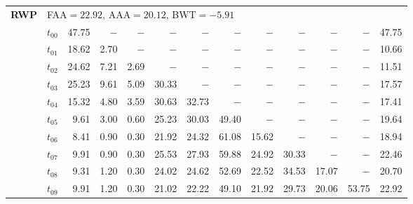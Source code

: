 \begin{table}[ht]
\begin{tabular}{@{}l l r r r r r r r r r r r@{}}
\midrule
\multirow{11}{*}{\textbf{RWP}} & \multicolumn{12}{l}{\quad\small FAA$=22.92$,\; AAA$=20.12$,\; BWT$=-5.91$} \\
 & $t_{00}$ & 47.75 & $-$ & $-$ & $-$ & $-$ & $-$ & $-$ & $-$ & $-$ & $-$ & 47.75 \\
 & $t_{01}$ & 18.62 & 2.70 & $-$ & $-$ & $-$ & $-$ & $-$ & $-$ & $-$ & $-$ & 10.66 \\
 & $t_{02}$ & 24.62 & 7.21 & 2.69 & $-$ & $-$ & $-$ & $-$ & $-$ & $-$ & $-$ & 11.51 \\
 & $t_{03}$ & 25.23 & 9.61 & 5.09 & 30.33 & $-$ & $-$ & $-$ & $-$ & $-$ & $-$ & 17.57 \\
 & $t_{04}$ & 15.32 & 4.80 & 3.59 & 30.63 & 32.73 & $-$ & $-$ & $-$ & $-$ & $-$ & 17.41 \\
 & $t_{05}$ & 9.61 & 3.00 & 0.60 & 25.23 & 30.03 & 49.40 & $-$ & $-$ & $-$ & $-$ & 19.64 \\
 & $t_{06}$ & 8.41 & 0.90 & 0.30 & 21.92 & 24.32 & 61.08 & 15.62 & $-$ & $-$ & $-$ & 18.94 \\
 & $t_{07}$ & 9.91 & 0.90 & 0.30 & 25.53 & 27.93 & 59.88 & 24.92 & 30.33 & $-$ & $-$ & 22.46 \\
 & $t_{08}$ & 9.31 & 1.20 & 0.30 & 24.02 & 24.62 & 52.69 & 22.52 & 34.53 & 17.07 & $-$ & 20.70 \\
 & $t_{09}$ & 9.91 & 1.20 & 0.30 & 21.02 & 22.22 & 49.10 & 21.92 & 29.73 & 20.06 & 53.75 & 22.92 \\
\bottomrule
\end{tabular}
\end{table}

